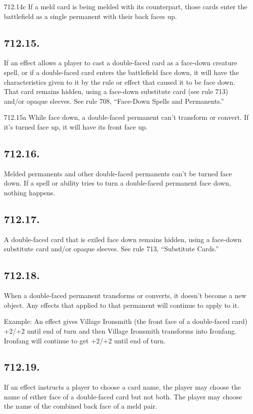 712.14c If a meld card is being melded with its counterpart, those cards enter the battlefield as a single permanent with their back faces up.

\subsection*{712.15.}
If an effect allows a player to cast a double-faced card as a face-down creature spell, or if a double-faced card enters the battlefield face down, it will have the characteristics given to it by the rule or effect that caused it to be face down. That card remains hidden, using a face-down substitute card (see rule 713) and/or opaque sleeves. See rule 708, “Face-Down Spells and Permanents.”

712.15a While face down, a double-faced permanent can’t transform or convert. If it’s turned face up, it will have its front face up.

\subsection*{712.16.}
Melded permanents and other double-faced permanents can’t be turned face down. If a spell or ability tries to turn a double-faced permanent face down, nothing happens.

\subsection*{712.17.}
A double-faced card that is exiled face down remains hidden, using a face-down substitute card and/or opaque sleeves. See rule 713, “Substitute Cards.”

\subsection*{712.18.}
When a double-faced permanent transforms or converts, it doesn’t become a new object. Any effects that applied to that permanent will continue to apply to it.

Example: An effect gives Village Ironsmith (the front face of a double-faced card) +2/+2 until end of turn and then Village Ironsmith transforms into Ironfang. Ironfang will continue to get +2/+2 until end of turn.

\subsection*{712.19.}
If an effect instructs a player to choose a card name, the player may choose the name of either face of a double-faced card but not both. The player may choose the name of the combined back face of a meld pair.

